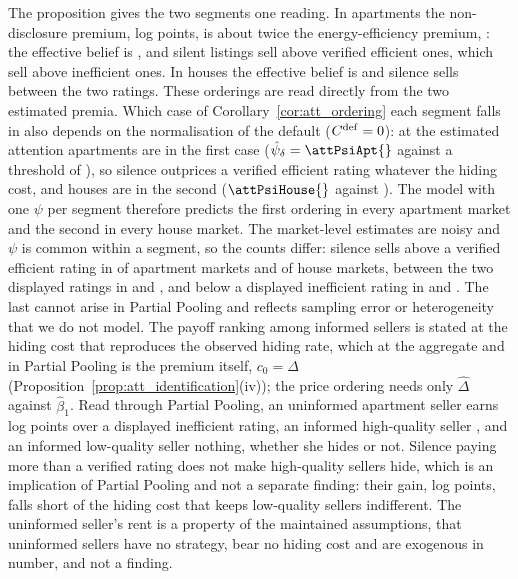 The proposition gives the two segments one reading. In apartments the non-disclosure premium, \attDthreeApt{} log points, is about twice the energy-efficiency premium, \attBthreeApt{}: the effective belief is \attRatioApt{}, and silent listings sell above verified efficient ones, which sell above inefficient ones. In houses the effective belief is \attRatioHouse{} and silence sells between the two ratings. These orderings are read directly from the two estimated premia. Which case of Corollary~\ref{cor:att_ordering} each segment falls in also depends on the normalisation of the default ($C^{\rm def}=0$): at the estimated attention apartments are in the first case ($\hat\psi_\delta=\attPsiApt{}$ against a threshold of \attPsiBarOneApt{}), so silence outprices a verified efficient rating whatever the hiding cost, and houses are in the second ($\attPsiHouse{}$ against \attPsiBarThetaHouse{}). The model with one $\psi$ per segment therefore predicts the first ordering in every apartment market and the second in every house market. The market-level estimates are noisy and $\psi$ is common within a segment, so the counts differ: silence sells above a verified efficient rating in \attNDgtBApt{} of \attNMarketsApt{} apartment markets and \attNDgtBHouse{} of \attNMarketsHouse{} house markets, between the two displayed ratings in \attNBetweenApt{} and \attNBetweenHouse{}, and below a displayed inefficient rating in \attRawNNegApt{} and \attRawNNegHouse{}. The last cannot arise in Partial Pooling and reflects sampling error or heterogeneity that we do not model. The payoff ranking among informed sellers is stated at the hiding cost that reproduces the observed hiding rate, which at the aggregate and in Partial Pooling is the premium itself, $c_0=\hat\Delta$ (Proposition~\ref{prop:att_identification}(iv)); the price ordering needs only $\hat\Delta$ against $\hat\beta_1$. Read through Partial Pooling, an uninformed apartment seller earns \attDthreeApt{} log points over a displayed inefficient rating, an informed high-quality seller \attBthreeApt{}, and an informed low-quality seller nothing, whether she hides or not. Silence paying more than a verified rating does not make high-quality sellers hide, which is an implication of Partial Pooling and not a separate finding: their gain, \attExcessApt{} log points, falls short of the hiding cost \attDthreeApt{} that keeps low-quality sellers indifferent. The uninformed seller's rent is a property of the maintained assumptions, that uninformed sellers have no strategy, bear no hiding cost and are exogenous in number, and not a finding.

